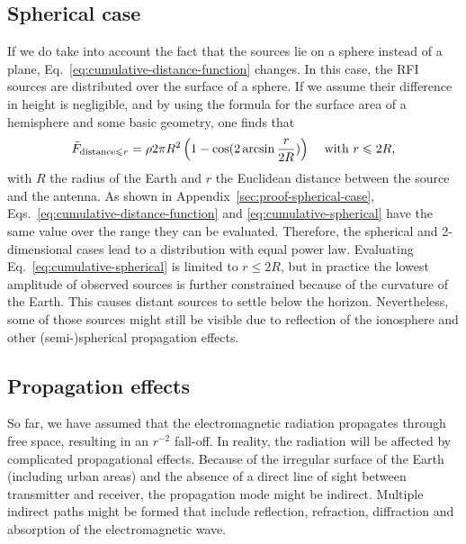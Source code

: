 \documentclass[useAMS,usenatbib]{mn2e}
\begin{document}
\subsection{Spherical case} \label{sec:spherical-geometry}
If we do take into account the fact that the sources lie on a sphere instead of a plane, Eq.~\eqref{eq:cumulative-distance-function} changes. In this case, the RFI sources are distributed over the surface of a sphere. If we assume their difference in height is negligible, and by using the formula for the surface area of a hemisphere and some basic geometry, one finds that
\begin{equation}\label{eq:cumulative-spherical}
\tilde{F}_{\textrm{distance} \le r} = \rho 2\pi R^2\left(1-\cos(2\arcsin \frac{r}{2R})\right) \hspace{0.4cm}\textrm{with } r \le 2R,
\end{equation}
with $R$ the radius of the Earth and $r$ the Euclidean distance between the source and the antenna. As shown in Appendix~\ref{sec:proof-spherical-case}, Eqs.~\eqref{eq:cumulative-distance-function} and \eqref{eq:cumulative-spherical} have the same value over the range they can be evaluated. Therefore, the spherical and 2-dimensional cases lead to a distribution with equal power law. Evaluating Eq.~\eqref{eq:cumulative-spherical} is limited to $r \le 2R$, but in practice the lowest amplitude of observed sources is further constrained because of the curvature of the Earth. This causes distant sources to settle below the horizon. Nevertheless, some of those sources might still be visible due to reflection of the ionosphere and other (semi-)spherical propagation effects.

\subsection{Propagation effects}
So far, we have assumed that the electromagnetic radiation propagates through free space, resulting in an $r^{-2}$ fall-off. In reality, the radiation will be affected by complicated propagational effects. Because of the irregular surface of the Earth (including urban areas) and the absence of a direct line of sight between transmitter and receiver, the propagation mode might be indirect. Multiple indirect paths might be formed that include reflection, refraction, diffraction and absorption of the electromagnetic wave. 
\end{document}
